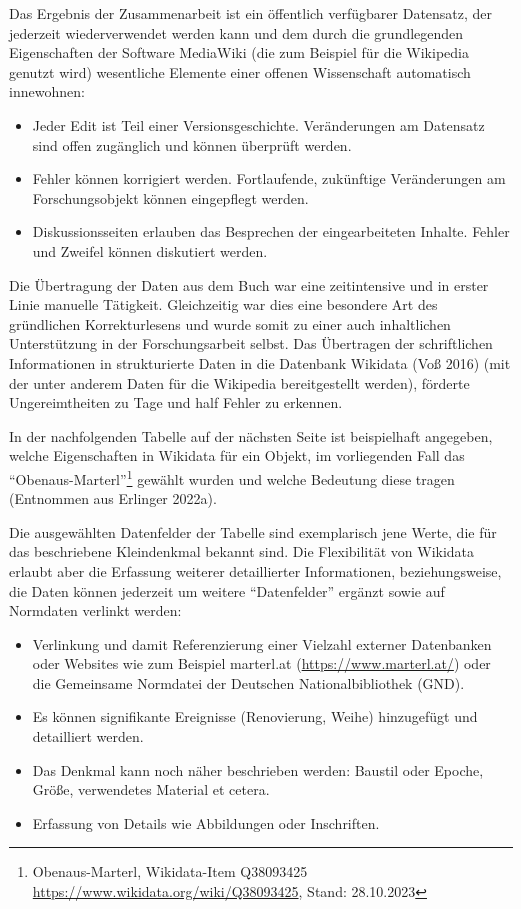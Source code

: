 \documentclass[a4paper,
fontsize=11pt,
oneside,
numbers=noperiodatend,
parskip=half-,
bibliography=totoc,
final
]{scrartcl}
\begin{document}
Das Ergebnis der Zusammenarbeit ist ein öffentlich verfügbarer
Datensatz, der jederzeit wiederverwendet werden kann und dem durch die
grundlegenden Eigenschaften der Software MediaWiki (die zum Beispiel für
die Wikipedia genutzt wird) wesentliche Elemente einer offenen
Wissenschaft automatisch innewohnen:

\begin{itemize}
\item
  Jeder Edit ist Teil einer Versionsgeschichte. Veränderungen am
  Datensatz sind offen zugänglich und können überprüft werden.
\item
  Fehler können korrigiert werden. Fortlaufende, zukünftige
  Veränderungen am Forschungsobjekt können eingepflegt werden.
\item
  Diskussionsseiten erlauben das Besprechen der eingearbeiteten Inhalte.
  Fehler und Zweifel können diskutiert werden.
\end{itemize}

Die Übertragung der Daten aus dem Buch war eine zeitintensive und in
erster Linie manuelle Tätigkeit. Gleichzeitig war dies eine besondere
Art des gründlichen Korrekturlesens und wurde somit zu einer auch
inhaltlichen Unterstützung in der Forschungsarbeit selbst. Das
Übertragen der schriftlichen Informationen in strukturierte Daten in die
Datenbank Wikidata (Voß 2016) (mit der unter anderem Daten für die
Wikipedia bereitgestellt werden), förderte Ungereimtheiten zu Tage und
half Fehler zu erkennen.

In der nachfolgenden Tabelle auf der nächsten Seite ist beispielhaft angegeben, welche
Eigenschaften in Wikidata für ein Objekt, im vorliegenden Fall das
\enquote{Obenaus-Marterl}\footnote{Obenaus-Marterl, Wikidata-Item
  Q38093425 \url{https://www.wikidata.org/wiki/Q38093425}, Stand:
  28.10.2023} gewählt wurden und welche Bedeutung diese tragen
(Entnommen aus Erlinger 2022a).

Die ausgewählten Datenfelder der Tabelle sind exemplarisch jene Werte,
die für das beschriebene Kleindenkmal bekannt sind. Die Flexibilität von
Wikidata erlaubt aber die Erfassung weiterer detaillierter
Informationen, beziehungsweise, die Daten können jederzeit um weitere
\enquote{Datenfelder} ergänzt sowie auf Normdaten verlinkt werden:

\begin{itemize}
\item
  Verlinkung und damit Referenzierung einer Vielzahl externer
  Datenbanken oder Websites wie zum Beispiel marterl.at
  (\url{https://www.marterl.at/}) oder die Gemeinsame Normdatei der
  Deutschen Nationalbibliothek (GND).
\item
  Es können signifikante Ereignisse (Renovierung, Weihe) hinzugefügt und
  detailliert werden.
\item
  Das Denkmal kann noch näher beschrieben werden: Baustil oder Epoche,
  Größe, verwendetes Material et cetera.
\item
  Erfassung von Details wie Abbildungen oder Inschriften.
\end{itemize}
\end{document}
